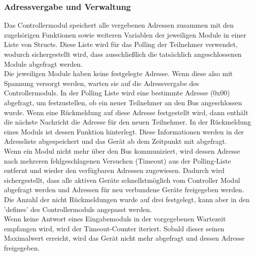 \subsubsection{Adressvergabe und Verwaltung}
Das Controllermodul speichert alle vergebenen Adressen zusammen mit den zugehörigen Funktionen sowie weiteren Variablen der jeweiligen Module in einer Liste von Structs. Diese Liste wird für das Polling der Teilnehmer verwendet, wodurch sichergestellt wird, dass ausschließlich die tatsächlich angeschlossenen Module abgefragt werden.\\





Die jeweiligen Module haben keine festgelegte Adresse. Wenn diese also mit Spannung versorgt werden, warten sie auf die Adressvergabe des Controllermoduls. In der Polling Liste wird eine bestimmte Adresse (0x00) abgefragt, um festzustellen, ob ein neuer Teilnehmer an den Bus angeschlossen wurde. Wenn eine Rückmeldung auf diese Adresse festgestellt wird, dann enthält die nächste Nachricht die Adresse für den neuen Teilnehmer. In der Rückmeldung eines Moduls ist dessen Funktion hinterlegt. Diese Informationen werden in der Adressliste abgespeichert und das Gerät ab dem Zeitpunkt mit abgefragt.\\



Wenn ein Modul nicht mehr über den Bus kommuniziert, wird dessen Adresse nach mehreren fehlgeschlagenen Versuchen (Timeout) aus der Polling-Liste entfernt und wieder den verfügbaren Adressen zugewiesen. Dadurch wird sichergestellt, dass alle aktiven Geräte schnellstmöglich vom Controller Modul abgefragt werden und Adressen für neu verbundene Geräte freigegeben werden. Die Anzahl der nicht Rückmeldungen wurde auf drei festgelegt, kann aber in den 'defines' des Controllermoduls angepasst werden.
\\



Wenn keine Antwort eines Eingabemoduls in der vorgegebenen Wartezeit empfangen wird, wird der Timeout-Counter iteriert. Sobald dieser seinen Maximalwert erreicht, wird das Gerät nicht mehr abgefragt und dessen Adresse freigegeben.


